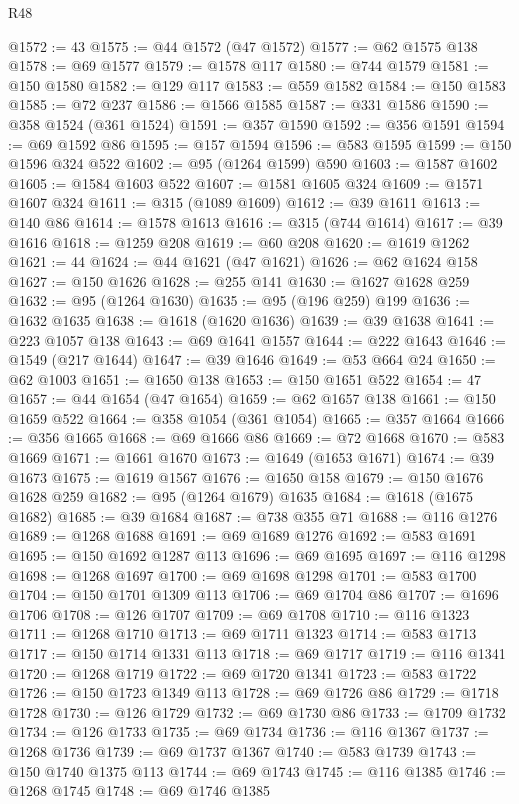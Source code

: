 \begin{lexlean}{R48}
\begin{coremodule}
@1572 := 43
@1575 := @44 @1572 (@47 @1572)
@1577 := @62 @1575 @138
@1578 := @69 @1577
@1579 := @1578 @117
@1580 := @744 @1579
@1581 := @150 @1580
@1582 := @129 @117
@1583 := @559 @1582
@1584 := @150 @1583
@1585 := @72 @237
@1586 := @1566 @1585
@1587 := @331 @1586
@1590 := @358 @1524 (@361 @1524)
@1591 := @357 @1590
@1592 := @356 @1591
@1594 := @69 @1592 @86
@1595 := @157 @1594
@1596 := @583 @1595
@1599 := @150 @1596 @324 @522
@1602 := @95 (@1264 @1599) @590
@1603 := @1587 @1602
@1605 := @1584 @1603 @522
@1607 := @1581 @1605 @324
@1609 := @1571 @1607 @324
@1611 := @315 (@1089 @1609)
@1612 := @39 @1611
@1613 := @140 @86
@1614 := @1578 @1613
@1616 := @315 (@744 @1614)
@1617 := @39 @1616
@1618 := @1259 @208
@1619 := @60 @208
@1620 := @1619 @1262
@1621 := 44
@1624 := @44 @1621 (@47 @1621)
@1626 := @62 @1624 @158
@1627 := @150 @1626
@1628 := @255 @141
@1630 := @1627 @1628 @259
@1632 := @95 (@1264 @1630)
@1635 := @95 (@196 @259) @199
@1636 := @1632 @1635
@1638 := @1618 (@1620 @1636)
@1639 := @39 @1638
@1641 := @223 @1057 @138
@1643 := @69 @1641 @1557
@1644 := @222 @1643
@1646 := @1549 (@217 @1644)
@1647 := @39 @1646
@1649 := @53 @664 @24
@1650 := @62 @1003
@1651 := @1650 @138
@1653 := @150 @1651 @522
@1654 := 47
@1657 := @44 @1654 (@47 @1654)
@1659 := @62 @1657 @138
@1661 := @150 @1659 @522
@1664 := @358 @1054 (@361 @1054)
@1665 := @357 @1664
@1666 := @356 @1665
@1668 := @69 @1666 @86
@1669 := @72 @1668
@1670 := @583 @1669
@1671 := @1661 @1670
@1673 := @1649 (@1653 @1671)
@1674 := @39 @1673
@1675 := @1619 @1567
@1676 := @1650 @158
@1679 := @150 @1676 @1628 @259
@1682 := @95 (@1264 @1679) @1635
@1684 := @1618 (@1675 @1682)
@1685 := @39 @1684
@1687 := @738 @355 @71
@1688 := @116 @1276
@1689 := @1268 @1688
@1691 := @69 @1689 @1276
@1692 := @583 @1691
@1695 := @150 @1692 @1287 @113
@1696 := @69 @1695
@1697 := @116 @1298
@1698 := @1268 @1697
@1700 := @69 @1698 @1298
@1701 := @583 @1700
@1704 := @150 @1701 @1309 @113
@1706 := @69 @1704 @86
@1707 := @1696 @1706
@1708 := @126 @1707
@1709 := @69 @1708
@1710 := @116 @1323
@1711 := @1268 @1710
@1713 := @69 @1711 @1323
@1714 := @583 @1713
@1717 := @150 @1714 @1331 @113
@1718 := @69 @1717
@1719 := @116 @1341
@1720 := @1268 @1719
@1722 := @69 @1720 @1341
@1723 := @583 @1722
@1726 := @150 @1723 @1349 @113
@1728 := @69 @1726 @86
@1729 := @1718 @1728
@1730 := @126 @1729
@1732 := @69 @1730 @86
@1733 := @1709 @1732
@1734 := @126 @1733
@1735 := @69 @1734
@1736 := @116 @1367
@1737 := @1268 @1736
@1739 := @69 @1737 @1367
@1740 := @583 @1739
@1743 := @150 @1740 @1375 @113
@1744 := @69 @1743
@1745 := @116 @1385
@1746 := @1268 @1745
@1748 := @69 @1746 @1385

\end{coremodule}
\end{lexlean}
